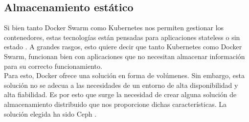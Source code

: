         \subsection{Almacenamiento estático}
                \label{ceph}
                \begin{text}
                        Si bien tanto Docker Swarm como Kubernetes nos permiten gestionar los contenedores, estas tecnologías están pensadas para aplicaciones stateless o sin estado \cite{stateless:online}. A grandes rasgos, esto quiere decir que tanto Kubernetes como Docker Swarm, funcionan bien con aplicaciones que no necesitan almacenar información para su correcto funcionamiento. \\
                        Para esto, Docker ofrece una solución en forma de volúmenes. Sin embargo, esta solución no se adecua a las necesidades de un entorno de alta disponibilidad  y alta fiabilidad. Es por esto que surge la necesidad de crear alguna solución de almacenamiento distribuido que nos proporcione dichas características. La solución elegida ha sido Ceph \cite{ceph:online}.
                \end{text}
